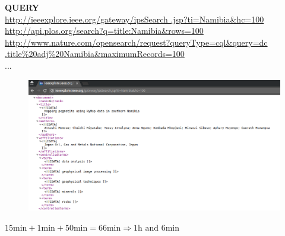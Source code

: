 \documentclass{beamer}
\begin{document}
\begin{frame}[fragile]
    \begin{center}
    \textbf{QUERY} \\
    \vspace{3mm}
    \small{\url{http://ieeexplore.ieee.org/gateway/ipsSearch
    .jsp?ti=Namibia&hc=100}} \\
    \pause
    \vspace{10mm}
    \small{\url{http://api.plos.org/search?q=title:Namibia&rows=100}} \\
    \pause
    \vspace{10mm}
    \small{\url{http://www.nature.com/opensearch/request?queryType=cql&query=dc
    .title%
    \small{...}
    \end{center}
\end{frame}

\begin{frame}[fragile]
\begin{figure}
     \includegraphics[width=1\textwidth]{static/xml.png}
 \end{figure}
\end{frame}

\begin{frame}
\begin{center}
\color{yellow!79}\Large{$15 \textrm{min} + 1 \textrm{min} + 50 \textrm{min} =
66 \textrm{min} \Rightarrow 1\textrm{h} \textrm{ and } 6 \text{min}$}
\end{center}
\end{frame}

\begin{frame}
    \begin{center}
    
    \end{center}
\end{frame}
\begin{frame}
    \begin{center}
    
    \end{center}
\end{frame}
\end{document}
